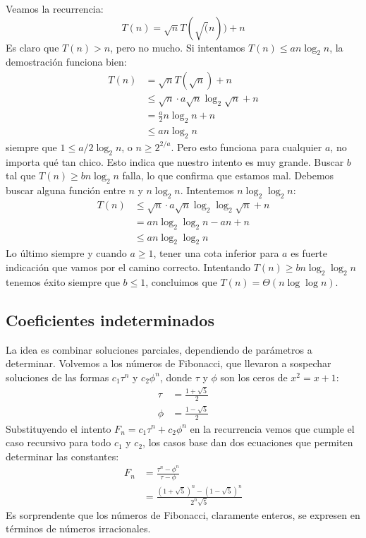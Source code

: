   Veamos la recurrencia:
  \begin{equation*}
    T(n)
      = \sqrt{n} T(\sqrt(n)) + n
  \end{equation*}
  Es claro que \(T(n) > n\),
  pero no mucho.
  Si intentamos \(T(n) \le a n \log_2 n\),
  la demostración funciona bien:
  \begin{align*}
    T(n)
      &=   \sqrt{n} T(\sqrt{n}) + n \\
      &\le \sqrt{n} \cdot a \sqrt{n} \log_2 \sqrt{n} + n \\
      &=   \frac{a}{2} n \log_2 n + n \\
      &\le a n \log_2 n
  \end{align*}
  siempre que \(1 \le a/2 \log_2 n\),
  o \(n \ge 2^{2/a}\).
  Pero esto funciona para cualquier \(a\),
  no importa qué tan chico.
  Esto indica que nuestro intento es muy grande.
  Buscar \(b\) tal que \(T(n) \ge b n \log_2 n\) falla,
  lo que confirma que estamos mal.
  Debemos buscar alguna función entre \(n\) y \(n \log_2 n\).
  Intentemos \(n \log_2 \log_2 n\):
  \begin{align*}
    T(n)
      &\le \sqrt{n} \cdot a \sqrt{n} \log_2 \log_2 \sqrt{n} + n \\
      &=   a n \log_2 \log_2 n - a n + n \\
      &\le a n \log_2 \log_2 n
  \end{align*}
  Lo último siempre y cuando \(a \ge 1\),
  tener una cota inferior para \(a\)
  es fuerte indicación que vamos por el camino correcto.
  Intentando \(T(n) \ge b n \log_2 \log_2 n\)
  tenemos éxito siempre que \(b \le 1\),
  concluimos que \(T(n) = \Theta(n \log \log n)\).

\subsection{Coeficientes indeterminados}
\label{sec:coef-indet}

  La idea es combinar soluciones parciales,
  dependiendo de parámetros a determinar.
  Volvemos a los números de Fibonacci,
  que llevaron a sospechar soluciones de las formas
  \(c_1 \tau^n\) y \(c_2 \phi^n\),
  donde \(\tau\) y \(\phi\) son los ceros de \(x^2 = x + 1\):
  \begin{align*}
    \tau
      &= \frac{1 + \sqrt{5}}{2} \\
    \phi
      &= \frac{1 - \sqrt{5}}{2}
  \end{align*}
  Substituyendo el intento \(F_n = c_1 \tau^n + c_2 \phi^n\)
  en la recurrencia vemos que cumple el caso recursivo
  para todo \(c_1\) y \(c_2\),
  los casos base dan dos ecuaciones que permiten determinar las constantes:
  \begin{align*}
    F_n
      &= \frac{\tau^n - \phi^n}{\tau - \phi} \\
      &= \frac{(1 + \sqrt{5})^n - (1 - \sqrt{5})^n}{2^n \sqrt{5}}
  \end{align*}
  Es sorprendente que los números de Fibonacci,
  claramente enteros,
  se expresen en términos de números irracionales.


